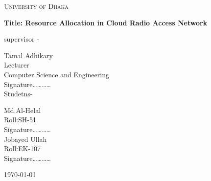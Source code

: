 \documentclass[12pt,a4paper]{report}
\begin{document}
\begin{titlepage}
\centering
{\scshape\LARGE University of Dhaka \par}
\vspace{1.5cm}
{\huge\bfseries Title: Resource Allocation in Cloud Radio Access Network\par}
\vspace{2cm}
supervisor -\par
Tamal Adhikary\\
Lecturer\\
Computer Science and Engineering\\
Signature\ldots\ldots\ldots\ldots\\
\vfill
Studetns-\par
Md.Al-Helal\\
Roll:SH-51\\
Signature\ldots\ldots\ldots\ldots\\
\vspace{1cm}
Jobayed Ullah\\
Roll:EK-107\\
Signature\ldots\ldots\ldots\ldots\\
\vfill
{\large \today\par}
\end{titlepage}
\end{document}
